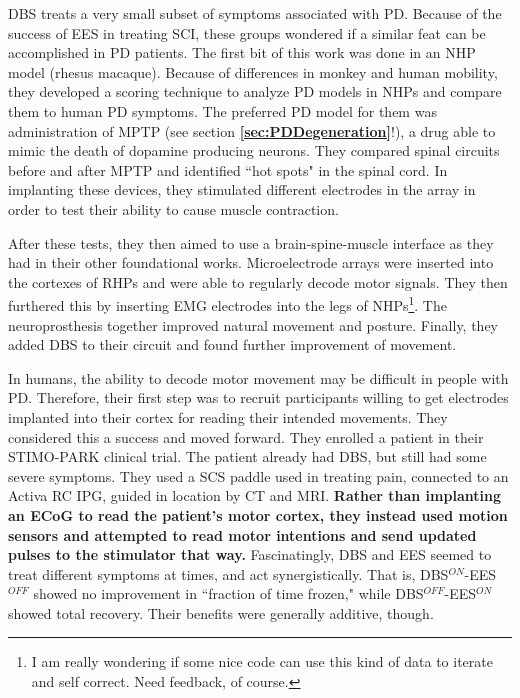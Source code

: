 DBS treats a very small subset of symptoms associated with PD. Because of the success of EES in treating SCI, these groups wondered if a similar feat can be accomplished in PD patients. The first bit of this work was done in an NHP model (rhesus macaque). Because of differences in monkey and human mobility, they developed a scoring technique to analyze PD models in NHPs and compare them to human PD symptoms. The preferred PD model for them was administration of MPTP (see section \textbf{\ref{sec:PDDegeneration}}!), a drug able to mimic the death of dopamine producing neurons. They compared spinal circuits before and after MPTP and identified ``hot spots" in the spinal cord. In implanting these devices, they stimulated different electrodes in the array in order to test their ability to cause muscle contraction. \newline

After these tests, they then aimed to use a brain-spine-muscle interface as they had in their other foundational works. Microelectrode arrays were inserted into the cortexes of RHPs and were able to regularly decode motor signals. They then furthered this by inserting EMG electrodes into the legs of NHPs\footnote{I am really wondering if some nice code can use this kind of data to iterate and self correct. Need feedback, of course.}. The neuroprosthesis together improved natural movement and posture. Finally, they added DBS to their circuit and found further improvement of movement. \newline

In humans, the ability to decode motor movement may be difficult in people with PD. Therefore, their first step was to recruit participants willing to get electrodes implanted into their cortex for reading their intended movements. They considered this a success and moved forward. They enrolled a patient in their STIMO-PARK clinical trial. The patient already had DBS, but still had some severe symptoms. They used a SCS paddle used in treating pain, connected to an Activa RC IPG, guided in location by CT and MRI. \textbf{Rather than implanting an ECoG to read the patient's motor cortex, they instead used motion sensors and attempted to read motor intentions and send updated pulses to the stimulator that way.} Fascinatingly, DBS and EES seemed to treat different symptoms at times, and act synergistically. That is, DBS${}^{ON}$-EES${}^{OFF}$ showed no improvement in ``fraction of time frozen," while DBS${}^{OFF}$-EES${}^{ON}$ showed total recovery. Their benefits were generally additive, though.\newline











